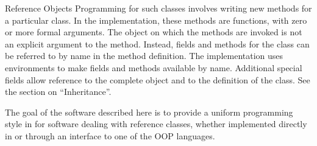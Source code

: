 \begin{Section}{Reference Objects}
Programming for such classes involves writing new methods for a
particular class.
In the \R{} implementation, these methods are \R{} functions, with zero or
more formal arguments.
The object on which the methods are invoked is not an explicit
argument to the method.
Instead, fields and methods for the class can be referred to by name
in the method definition.
The implementation uses \R{} environments to make fields and methods
available by name.
Additional special fields allow reference to the complete object and
to the definition of the class.  See the section on ``Inheritance''.

The goal of the software described here is to provide a uniform
programming style in \R{} for software dealing with reference classes, whether
implemented directly in \R{} or through an interface to one of the OOP
languages.
\end{Section}
%
